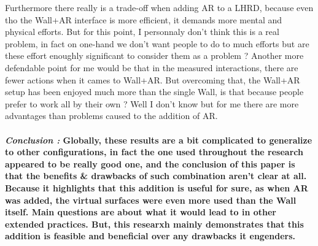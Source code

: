 {                \newline
                \indent \indent \textnormal{Furthermore there really is a trade-off when adding AR to a LHRD, because even tho the Wall+AR interface is more efficient, it demands more mental and physical efforts. But for this point, I personnaly
                don't think this is a real problem, in fact on one-hand we don't want people to do to much efforts but are these effort enoughly significant to consider them as a problem ? Another more defendable point for me 
                would be that in the measured interactions, there are fewer actions when it cames to Wall+AR. But overcoming that, the Wall+AR setup has been enjoyed much more than the single Wall, is that because people prefer to work all by their
                own ? Well I don't know but for me there are more advantages than problems caused to the addition of AR.} }

    \paragraph{ \textit{Conclusion :}
                \newline 
                \indent \indent \textnormal{Globally, these results are a bit complicated to generalize to other configurations, in fact the one used throughout the research appeared to be 
                really good one, and the conclusion of this paper is that the benefits \& drawbacks of such combination aren't clear at all. Because it highlights that this addition is useful for sure, as when AR was added, the virtual 
                surfaces were even more used than the Wall itself. Main questions are about what it would lead to in other extended practices.}
                \newline 
                \indent \indent \textnormal{But, this researxh mainly demonstrates that this addition is feasible and beneficial over any drawbacks it engenders.}}